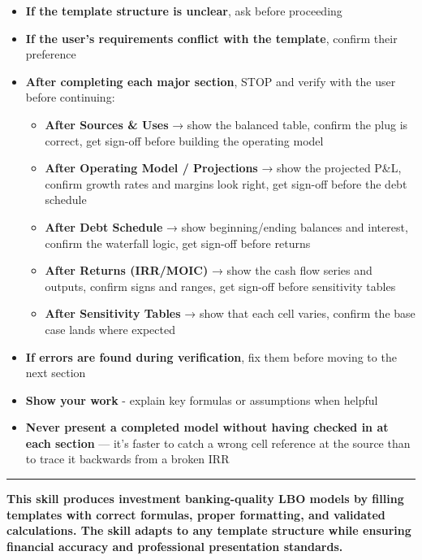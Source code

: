 \documentclass[11pt]{article}
\begin{document}
\begin{itemize}[leftmargin=*,itemsep=2pt,topsep=2pt]
\item {} \textbf{If the template structure is unclear}, ask before proceeding
\item {} \textbf{If the user's requirements conflict with the template}, confirm their preference
\item {} \textbf{After completing each major section}, STOP and verify with the user before continuing:
\begin{itemize}[leftmargin=*,itemsep=2pt,topsep=2pt]
\item {} \textbf{After Sources \& Uses} → show the balanced table, confirm the plug is correct, get sign-off before building the operating model
\item {} \textbf{After Operating Model / Projections} → show the projected P\&L, confirm growth rates and margins look right, get sign-off before the debt schedule
\item {} \textbf{After Debt Schedule} → show beginning/ending balances and interest, confirm the waterfall logic, get sign-off before returns
\item {} \textbf{After Returns (IRR/MOIC)} → show the cash flow series and outputs, confirm signs and ranges, get sign-off before sensitivity tables
\item {} \textbf{After Sensitivity Tables} → show that each cell varies, confirm the base case lands where expected
\end{itemize}
\item {} \textbf{If errors are found during verification}, fix them before moving to the next section
\item {} \textbf{Show your work} - explain key formulas or assumptions when helpful
\item {} \textbf{Never present a completed model without having checked in at each section} — it's faster to catch a wrong cell reference at the source than to trace it backwards from a broken IRR
\end{itemize}

\vspace{0.5em}\hrule\vspace{0.5em}

\textbf{This skill produces investment banking-quality LBO models by filling templates with correct formulas, proper formatting, and validated calculations. The skill adapts to any template structure while ensuring financial accuracy and professional presentation standards.}
\end{document}
